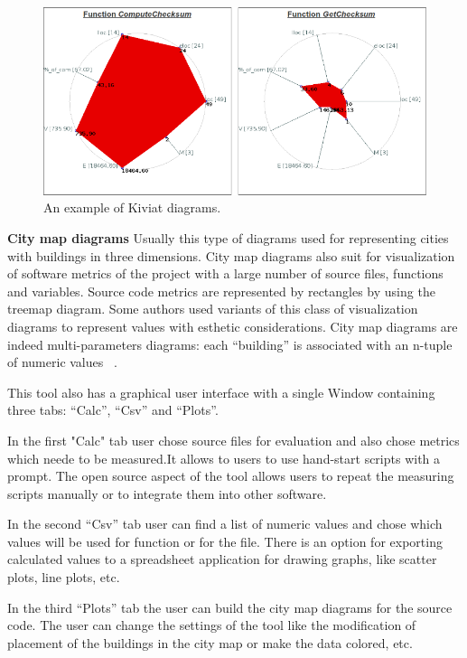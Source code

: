 \begin{figure}[ht]
	\centering
	\includegraphics[width=\textwidth]{figures/metrix.png}
	\caption{An example of Kiviat diagrams.}
	\label{fig:metrix}
\end{figure}

\textbf{City map diagrams}
Usually this type of diagrams used for representing cities with buildings in three dimensions. City map diagrams also suit for visualization of software metrics of the project with a large number of source files, functions and variables. Source code metrics are represented by rectangles by using the treemap diagram. Some authors used variants of this class of visualization diagrams to represent  values with esthetic considerations. City map diagrams are indeed multi-parameters diagrams: each “building” is associated with an n-tuple of numeric values ~\cite{metrix}.  

This tool also has a graphical user interface with a single Window containing three tabs: “Calc”, “Csv” and “Plots”.

In the first "Calc" tab user chose source files for evaluation and also chose metrics which neede to be measured.It allows to users to use  hand-start scripts with a prompt. The open source aspect of the tool allows users to repeat the measuring scripts manually or to integrate them into other software.

In the second “Csv” tab user can find a list of numeric values and chose which values will be used for function or for the file. There is an option for exporting calculated values to a spreadsheet application for drawing graphs, like scatter plots, line plots, etc.

In the third “Plots” tab the user can build the city map diagrams for the source code. The user can change the settings of the tool like the modification of placement of the buildings in the city map or make the data colored, etc.

